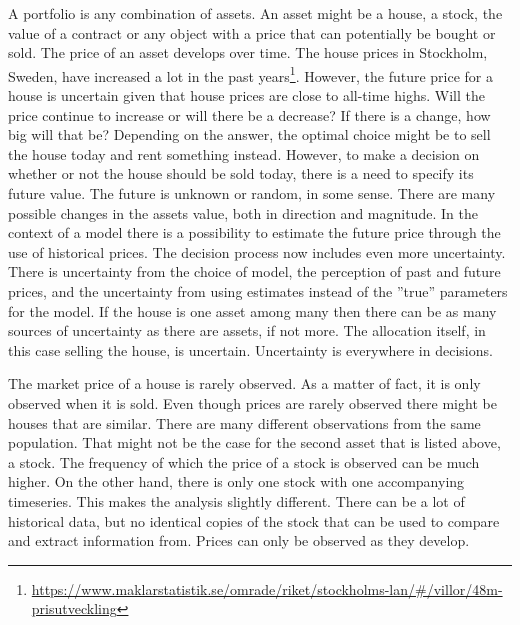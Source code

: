 A portfolio is any combination of assets.
An asset might be a house, a stock, the value of a contract or any object with a price that can potentially be bought or sold.
The price of an asset develops over time.
The house prices in Stockholm, Sweden, have increased a lot in the past years\footnote{\url{https://www.maklarstatistik.se/omrade/riket/stockholms-lan/\#/villor/48m-prisutveckling}}.
However, the future price for a house is uncertain given that house prices are close to all-time highs.
Will the price continue to increase or will there be a decrease?
If there is a change, how big will that be?
Depending on the answer, the optimal choice might be to sell the house today and rent something instead.
However, to make a decision on whether or not the house should be sold today, there is a need to specify its future value. 
The future is unknown or random, in some sense.
There are many possible changes in the assets value, both in direction and magnitude.
In the context of a model there is a possibility to estimate the future price through the use of historical prices.
The decision process now includes even more uncertainty.
There is uncertainty from the choice of model, the perception of past and future prices, and the uncertainty from using estimates instead of the ''true'' parameters for the model.
If the house is one asset among many then there can be as many sources of uncertainty as there are assets, if not more.
The allocation itself, in this case selling the house, is uncertain.
Uncertainty is everywhere in decisions.

The market price of a house is rarely observed.
As a matter of fact, it is only observed when it is sold.
Even though prices are rarely observed there might be houses that are similar.
There are many different observations from the same population. 
That might not be the case for the second asset that is listed above, a stock.
The frequency of which the price of a stock is observed can be much higher.
On the other hand, there is only one stock with one accompanying timeseries.
This makes the analysis slightly different.
There can be a lot of historical data, but no identical copies of the stock that can be used to compare and extract information from.
Prices can only be observed as they develop.

